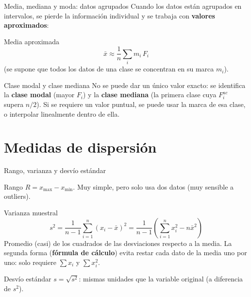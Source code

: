\documentclass[aspectratio=169,11pt]{beamer}
\begin{document}
\begin{frame}{Media, mediana y moda: datos agrupados}
Cuando los datos están agrupados en intervalos, se pierde la información individual y se trabaja con \textbf{valores aproximados}:
\begin{block}{Media aproximada}
\[
\bar{x} \approx \frac{1}{n}\sum_{i} m_i \, F_i
\]
(se supone que todos los datos de una clase se concentran en su marca $m_i$).
\end{block}
\begin{block}{Clase modal y clase mediana}
No se puede dar un único valor exacto: se identifica la \textbf{clase modal} (mayor $F_i$) y la \textbf{clase mediana} (la primera clase cuya $F_i^{ac}$ supera $n/2$). Si se requiere un valor puntual, se puede usar la marca de esa clase, o interpolar linealmente dentro de ella.
\end{block}
\end{frame}

\section{Medidas de dispersión}

\begin{frame}{Rango, varianza y desvío estándar}
\begin{block}{Rango}
$R = x_{\max}-x_{\min}$. Muy simple, pero solo usa dos datos (muy sensible a outliers).
\end{block}
\begin{block}{Varianza muestral}
\[
s^2 = \frac{1}{n-1}\sum_{i=1}^n (x_i-\bar{x})^2 = \frac{1}{n-1}\left(\sum_{i=1}^n x_i^2 - n\bar{x}^2\right)
\]
Promedio (casi) de los cuadrados de las desviaciones respecto a la media. La segunda forma (\textbf{fórmula de cálculo}) evita restar cada dato de la media uno por uno: solo requiere $\sum x_i$ y $\sum x_i^2$.
\end{block}
\begin{block}{Desvío estándar}
$s = \sqrt{s^2}$: mismas unidades que la variable original (a diferencia de $s^2$).
\end{block}
\end{frame}
\end{document}
